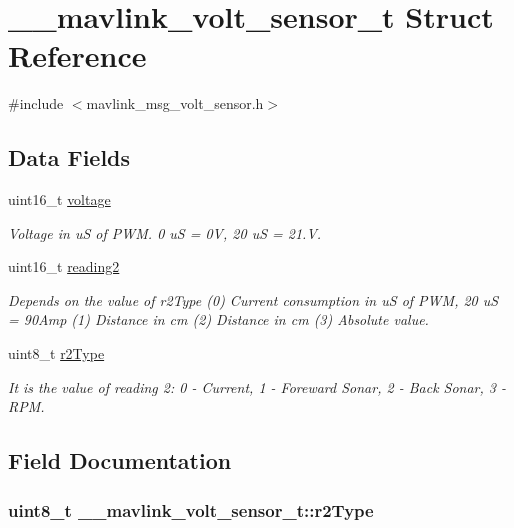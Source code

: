 \hypertarget{struct____mavlink__volt__sensor__t}{\section{\+\_\+\+\_\+mavlink\+\_\+volt\+\_\+sensor\+\_\+t Struct Reference}
\label{struct____mavlink__volt__sensor__t}
}


{\ttfamily \#include $<$mavlink\+\_\+msg\+\_\+volt\+\_\+sensor.\+h$>$}

\subsection*{Data Fields}
\begin{DoxyCompactItemize}
\item 
uint16\+\_\+t \hyperlink{struct____mavlink__volt__sensor__t_a268b47347a1ba8bbee75c136ceeff7a5}{voltage}
\begin{DoxyCompactList}\small\item\em Voltage in u\+S of P\+W\+M. 0 u\+S = 0\+V, 20 u\+S = 21.\+V. \end{DoxyCompactList}\item 
uint16\+\_\+t \hyperlink{struct____mavlink__volt__sensor__t_a2548b639aea459ba70058bbe9d9041ea}{reading2}
\begin{DoxyCompactList}\small\item\em Depends on the value of r2\+Type (0) Current consumption in u\+S of P\+W\+M, 20 u\+S = 90\+Amp (1) Distance in cm (2) Distance in cm (3) Absolute value. \end{DoxyCompactList}\item 
uint8\+\_\+t \hyperlink{struct____mavlink__volt__sensor__t_aa54e9888582ca6f7fedc75ed3dfe3fcf}{r2\+Type}
\begin{DoxyCompactList}\small\item\em It is the value of reading 2\+: 0 -\/ Current, 1 -\/ Foreward Sonar, 2 -\/ Back Sonar, 3 -\/ R\+P\+M. \end{DoxyCompactList}\end{DoxyCompactItemize}


\subsection{Field Documentation}
\hypertarget{struct____mavlink__volt__sensor__t_aa54e9888582ca6f7fedc75ed3dfe3fcf}{
\subsubsection[{r2\+Type}]{\setlength{\rightskip}{0pt plus 5cm}uint8\+\_\+t \+\_\+\+\_\+mavlink\+\_\+volt\+\_\+sensor\+\_\+t\+::r2\+Type}}\label{struct____mavlink__volt__sensor__t_aa54e9888582ca6f7fedc75ed3dfe3fcf}



